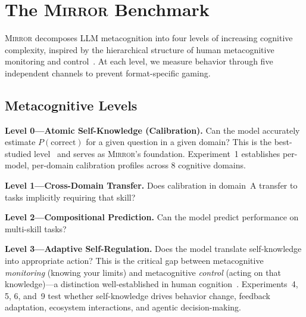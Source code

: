 \documentclass[10pt]{article}
\newcommand{\mirror}{\textsc{Mirror}}
\begin{document}
\section{The \mirror{} Benchmark}
\label{sec:benchmark}

\mirror{} decomposes LLM metacognition into four levels of increasing cognitive
complexity, inspired by the hierarchical structure of human metacognitive monitoring
and control~\citep{flavell1979metacognition, nelson1990metamemory}. At each level,
we measure behavior through five independent channels to prevent format-specific
gaming.

\subsection{Metacognitive Levels}

\textbf{Level 0---Atomic Self-Knowledge (Calibration).}
Can the model accurately estimate $P(\text{correct})$ for a given question in a
given domain? This is the best-studied level~\citep{kadavath2022language,
kapoor2024calibration} and serves as \mirror{}'s foundation. Experiment~1
establishes per-model, per-domain calibration profiles across 8 cognitive domains.

\textbf{Level 1---Cross-Domain Transfer.}
Does calibration in domain~A transfer to tasks implicitly requiring that skill?

\textbf{Level 2---Compositional Prediction.}
Can the model predict performance on multi-skill tasks?

\textbf{Level 3---Adaptive Self-Regulation.}
Does the model translate self-knowledge into appropriate action? This is the
critical gap between metacognitive \textit{monitoring} (knowing your limits) and
metacognitive \textit{control} (acting on that knowledge)---a distinction
well-established in human cognition~\citep{metcalfe2008metacognitive}.
Experiments~4, 5, 6, and~9 test whether self-knowledge drives behavior change,
feedback adaptation, ecosystem interactions, and agentic decision-making.
\end{document}
